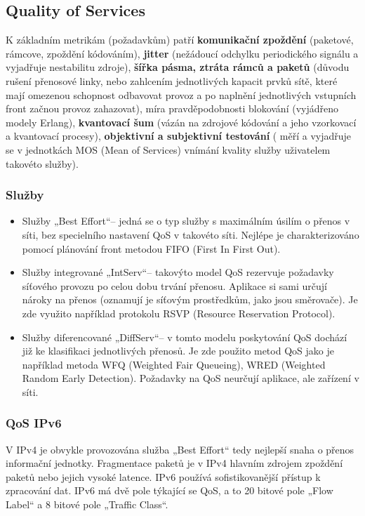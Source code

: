 \subsection{Quality of Services}
K základním metrikám (požadavkům) patří \textbf{komunikační zpoždění} (paketové, rámcove, zpoždění kódováním), \textbf{jitter} (nežádoucí odchylku periodického signálu a vyjadřuje nestabilitu zdroje), \textbf{šířka pásma, ztráta rámců a paketů} (důvodu rušení přenosové linky, nebo zahlcením jednotlivých kapacit prvků sítě, které mají omezenou schopnost odbavovat provoz a po naplnění jednotlivých vstupních front začnou provoz zahazovat), míra pravděpodobnosti blokování (vyjádřeno modely Erlang), \textbf{kvantovací šum} (vázán na zdrojové kódování a jeho vzorkovací
a kvantovací procesy), \textbf{objektivní a subjektivní testování} ( měří a vyjadřuje se v jednotkách MOS (Mean of Services) vnímání kvality služby uživatelem takovéto služby).

\subsubsection{Služby}
\begin{itemize}
    \item Služby „Best Effort“– jedná se o typ služby s maximálním úsilím o přenos v síti, bez specielního nastavení QoS v takovéto síti. Nejlépe je charakterizováno pomocí plánování front metodou FIFO (First In First Out).
    \item Služby integrované „IntServ“– takovýto model QoS rezervuje požadavky síťového provozu po celou dobu trvání přenosu. Aplikace si sami určují nároky na přenos (oznamují je síťovým prostředkům, jako jsou směrovače). Je zde využito například protokolu RSVP (Resource Reservation Protocol).
    \item Služby diferencované „DiffServ“– v tomto modelu poskytování QoS dochází již ke klasifikaci jednotlivých přenosů. Je zde použito metod QoS jako je například metoda WFQ (Weighted Fair Queueing), WRED (Weighted Random Early Detection). Požadavky na QoS neurčují aplikace, ale zařízení v síti.
\end{itemize}

\subsubsection{QoS IPv6}
V IPv4 je obvykle provozována služba „Best Effort“ tedy nejlepší snaha o přenos informační jednotky. Fragmentace paketů je v IPv4 hlavním zdrojem zpoždění paketů nebo jejich vysoké latence. IPv6 používá sofistikovanější přístup k zpracování dat. IPv6 má dvě pole týkající se QoS, a to 20 bitové pole „Flow Label“ a 8 bitové pole „Traffic Class“.


